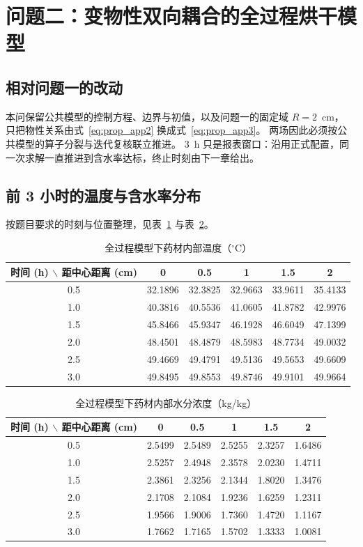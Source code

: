 \section{问题二：变物性双向耦合的全过程烘干模型}

\subsection{相对问题一的改动}

本问保留公共模型的控制方程、边界与初值，以及问题一的固定域 $R=2$~cm，
只把物性关系由式~\eqref{eq:prop_app2} 换成式~\eqref{eq:prop_app3}。
两场因此必须按公共模型的算子分裂与迭代复核联立推进。
$3$~h 只是报表窗口：沿用正式配置，同一次求解一直推进到含水率达标，终止时刻由下一章给出。

\subsection{前 3 小时的温度与含水率分布}

按题目要求的时刻与位置整理，见表~\ref{tab:p2_T} 与表~\ref{tab:p2_C}。

\begin{table}[H]
\centering
\caption{全过程模型下药材内部温度（$^\circ$C）}\label{tab:p2_T}
\begin{tabular}{cccccc}
\toprule
时间 (h) $\backslash$ 距中心距离 (cm) & 0 & 0.5 & 1 & 1.5 & 2 \\
\midrule
0.5 & 32.1896 & 32.3825 & 32.9663 & 33.9611 & 35.4133 \\
1.0 & 40.3816 & 40.5536 & 41.0605 & 41.8782 & 42.9976 \\
1.5 & 45.8466 & 45.9347 & 46.1928 & 46.6049 & 47.1399 \\
2.0 & 48.4501 & 48.4879 & 48.5983 & 48.7734 & 49.0032 \\
2.5 & 49.4669 & 49.4791 & 49.5136 & 49.5653 & 49.6609 \\
3.0 & 49.8495 & 49.8553 & 49.8746 & 49.9101 & 49.9664 \\
\bottomrule
\end{tabular}
\end{table}

\begin{table}[H]
\centering
\caption{全过程模型下药材内部水分浓度（kg/kg）}\label{tab:p2_C}
\begin{tabular}{cccccc}
\toprule
时间 (h) $\backslash$ 距中心距离 (cm) & 0 & 0.5 & 1 & 1.5 & 2 \\
\midrule
0.5 & 2.5499 & 2.5489 & 2.5255 & 2.3257 & 1.6486 \\
1.0 & 2.5257 & 2.4948 & 2.3578 & 2.0230 & 1.4711 \\
1.5 & 2.3861 & 2.3256 & 2.1344 & 1.8020 & 1.3476 \\
2.0 & 2.1708 & 2.1084 & 1.9236 & 1.6259 & 1.2311 \\
2.5 & 1.9566 & 1.9006 & 1.7360 & 1.4720 & 1.1167 \\
3.0 & 1.7662 & 1.7165 & 1.5702 & 1.3333 & 1.0081 \\
\bottomrule
\end{tabular}
\end{table}

